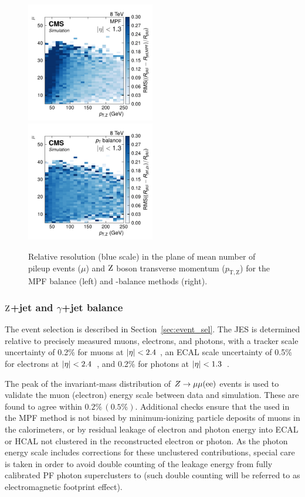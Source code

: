 \documentclass[11pt,twoside,a4paper,cmspaper,final,collab]{cms-tdr}
\begin{document}
\begin{figure}[htbp!]
\includegraphics[width=0.5\textwidth]{Figure_020-a.pdf}
\includegraphics[width=0.5\textwidth]{Figure_020-b.pdf}
\caption{\label{fig:ptvsmpf}
Relative resolution (blue scale) in the plane of mean number of pileup events ($\mu$) and $\mathrm{Z}$ boson transverse momentum ($p_\mathrm{T, Z}$) for the MPF balance (left) and \pt-balance methods (right).
}
\end{figure}

\label{Sec:L3residual}
\subsubsection*{$\mathrm{Z}$+jet and $\gamma$+jet balance}

The event selection is described in Section~\ref{sec:event_sel}. The JES is determined relative to precisely measured muons, electrons, and photons, with a tracker scale uncertainty of 0.2\% for muons at $\lvert \eta \rvert<2.4$ \cite{cmsmuons},
an ECAL scale uncertainty of 0.5\% for electrons at $\lvert \eta \rvert<2.4$~\cite{Chatrchyan:2013dga}, and 0.2\% for photons at $\lvert \eta \rvert<1.3$~\cite{Khachatryan:2015iwa}.

The peak of the invariant-mass distribution of $Z\to\mu\mu ({\mathrm{e}\mathrm{e}})$ events is used to validate the muon (electron) energy scale between data and simulation. These are found to agree within $0.2\%\,(0.5\%)$.
Additional checks ensure that the \ptvecmiss used in the MPF method is not biased by minimum-ionizing particle deposits of muons in the calorimeters, or by residual leakage of electron and photon energy into ECAL or HCAL not clustered in the reconstructed electron or photon. As the photon energy scale includes corrections for these unclustered contributions, special care is taken in order to avoid double counting of the leakage energy from fully calibrated PF photon superclusters to \ptvecmiss (such double counting will be referred to as electromagnetic footprint effect).
\end{document}
